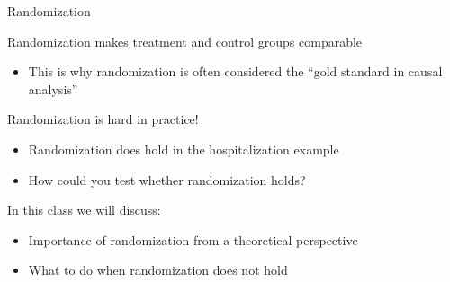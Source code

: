\documentclass[handout, 8pt]{beamer}
\begin{document}
\begin{frame}{Randomization}

Randomization makes treatment and control groups comparable
\begin{itemize}
    \item This is why randomization is often considered the ``gold standard in causal analysis''
\end{itemize}

\vspace{2ex}
Randomization is hard in practice!
\begin{itemize}
    \item Randomization does hold in the hospitalization example
    \item How could you test whether randomization holds?

\end{itemize}

\vspace{2ex}
In this class we will discuss:
\begin{itemize}
    \item Importance of randomization from a theoretical perspective
    \item What to do when randomization does not hold
\end{itemize}

\end{frame}
\end{document}
